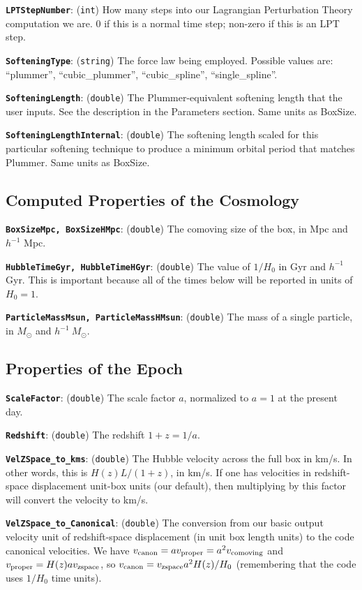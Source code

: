 \documentclass[11pt,preprint]{aastex}
\newcommand{\param}[2]{\medskip\noindent\textbf{\texttt{#1}}: ({\tt #2}) }
\begin{document}
\param{LPTStepNumber}{int} How many steps into our Lagrangian Perturbation Theory computation we are.  0 if this is a normal time step; non-zero if this is an LPT step.

\param{SofteningType}{string} The force law being employed.  Possible
values are: ``plummer'', ``cubic\_plummer'', ``cubic\_spline'', ``single\_spline''.

\param{SofteningLength}{double} The Plummer-equivalent softening length
that the user inputs.  See the description in the Parameters section.
Same units as BoxSize.

\param{SofteningLengthInternal}{double} The softening length scaled
for this particular softening technique to produce a minimum orbital
period that matches Plummer.  Same units as BoxSize.


\subsection{Computed Properties of the Cosmology}

\param{BoxSizeMpc, BoxSizeHMpc}{double} The comoving size of the
box, in Mpc and $h^{-1}$ Mpc.

\param{HubbleTimeGyr, HubbleTimeHGyr}{double} The value of $1/H_0$
in Gyr and $h^{-1}$ Gyr.  This is important because all of the times
below will be reported in units of $H_0=1$.

\param{ParticleMassMsun, ParticleMassHMsun}{double} The mass of a
single particle, in $M_\odot$ and $h^{-1}\ M_\odot$.

\subsection{Properties of the Epoch}

\param{ScaleFactor}{double} The scale factor $a$, normalized to $a=1$ 
at the present day.

\param{Redshift}{double} The redshift $1+z = 1/a$.

\param{VelZSpace\_to\_kms}{double} The Hubble velocity across
the full box in km/s.  In other words, this is $H(z)L/(1+z)$, in
km/s.  If one has velocities in redshift-space displacement unit-box 
units (our default), then multiplying by this factor will convert the
velocity to km/s.

\param{VelZSpace\_to\_Canonical}{double} The conversion from our basic
output velocity unit of redshift-space displacement (in unit box
length units) to the code canonical velocities. 
We have $v_{\rm canon} = a v_{\rm proper} = a^2 v_{\rm comoving}$
and $v_{\rm proper} = H(z) a v_{\rm zspace}$, so
$v_{\rm canon} = v_{\rm zspace} a^2 H(z)/H_0$ (remembering that
the code uses $1/H_0$ time units).
\end{document}
